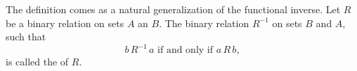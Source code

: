 \exercise
The definition comes as a natural generalization of the functional inverse.
Let $R$ be a binary relation on sets $A$ an $B$.
The binary relation $R^{-1}$ on sets $B$ and $A$, such that
\[
    b\,R^{-1}\,a \text{ if and only if } a\,R\,b,
\]
is called the  of $R$.
